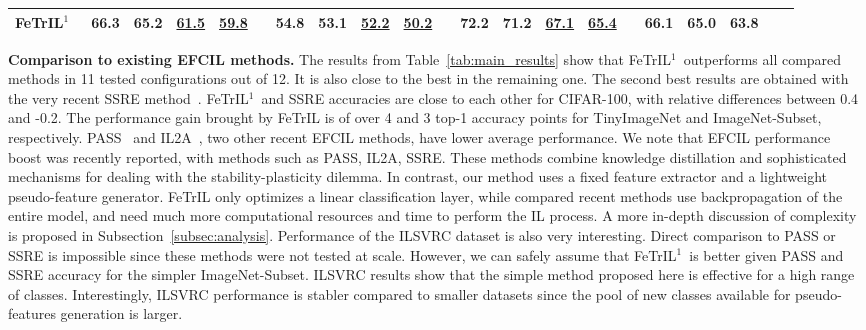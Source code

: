 \documentclass[10pt,twocolumn,letterpaper]{article}
\makeatletter
\newcommand{\ourmodel}{FeTrIL\@\xspace}
\newcommand{\ourmodelone}{FeTrIL$^1$~}
\makeatother
\begin{document}
\begin{table*}[t]
\begin{center}
{\begin{tabular}{@{\kern0.5em}llccccccccccccccccccc@{\kern0.5em}}
\ourmodelone  & \textbf{66.3} & \textbf{65.2} & \underline{61.5} & \underline{59.8} && \textbf{54.8} & \textbf{53.1} & \underline{52.2} & \underline{50.2} && \textbf{72.2} & \textbf{71.2} & \underline{67.1} & \underline{65.4} && \textbf{66.1} & \textbf{65.0} & \textbf{63.8} \\     
\hline
\end{tabular}
}
\end{center}
\vspace{-2mm}
	\caption{Average top-1 incremental accuracy in EFCIL with different numbers of incremental steps.
	\ourmodelone results are reported with pseudo-features translated from the most similar new class.
	"-" cells indicate that results were not available (see supp. material for details). "x" cells indicate that the configuration is impossible for that method. 
	\textbf{Best results - in bold}, \underline{second best - underlined}.\vspace{-4.3mm}}
\label{tab:main_results}
\end{table*}


\textbf{Comparison to existing EFCIL methods.} The results from Table~\ref{tab:main_results} show that \ourmodelone outperforms all compared methods in 11 tested configurations out of 12. 
It is also close to the best in the remaining one.
The second best results are obtained with the very recent SSRE method~\cite{zhu2022self}.
\ourmodelone and SSRE accuracies are close to each other for CIFAR-100, with relative differences between 0.4 and -0.2.
The performance gain brought by \ourmodel is of over 4 and 3 top-1 accuracy points for TinyImageNet and ImageNet-Subset, respectively. 
PASS~\cite{zhu2021pass} and IL2A~\cite{zhu2021class}, two other recent EFCIL methods, have lower average performance.
We note that EFCIL performance boost was recently reported, with methods such as PASS, IL2A, SSRE.
These methods combine knowledge distillation and sophisticated mechanisms for dealing with the stability-plasticity dilemma.
In contrast, our method uses a fixed feature extractor and a lightweight pseudo-feature generator. 
\ourmodel only optimizes a linear classification layer, while compared recent methods use backpropagation of the entire model, and need much more computational resources and time to perform the IL process.
A more in-depth discussion of complexity is proposed in Subsection~\ref{subsec:analysis}.
Performance of the ILSVRC dataset is also very interesting. 
Direct comparison to PASS or SSRE is impossible since these methods were not tested at scale.
However, we can safely assume that \ourmodelone is better given PASS and SSRE accuracy for the simpler ImageNet-Subset. 
ILSVRC results show that the simple method proposed here is effective for a high range of classes. 
Interestingly, ILSVRC performance is stabler compared to smaller datasets since the pool of new classes available for pseudo-features generation is larger.
\end{document}
